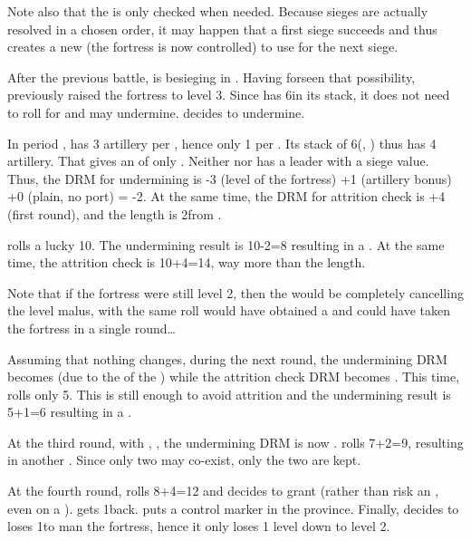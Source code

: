 Note also that the \SoS is only checked when needed. Because sieges are
actually resolved in a chosen order, it may happen that a first siege succeeds
and thus creates a new \SoS (the fortress is now controlled) to use for the
next siege.

\begin{exemple}[Undermining]
  After the previous battle, \FRA is besieging \villeArras in
  \provinceArtois. Having forseen that possibility, \HIS previously raised the
  fortress to level 3. Since \FRA has 6\LD in its stack, it does not need to
  roll for  and may undermine. \FRA decides to
  undermine.

  In period , \FRA has 3 artillery per \ARMY\faceplus, hence only
  1 per \ARMY\facemoins. Its stack of 6\LD (\ARMY\faceplus, \ARMY\facemoins)
  thus has 4 artillery. That gives an  of only
  . Neither \FRA nor \HIS has a leader with a siege value. Thus, the
  DRM for undermining is -3 (level of the fortress) +1 (artillery bonus) +0
  (plain, no port) = -2. At the same time, the DRM for attrition check is +4
  (first round), and the \LoS length is 2\MP from \villeParis.

  \FRA rolls a lucky 10. The undermining result is 10-2=8 resulting in a
  \USURE\faceplus. At the same time, the attrition check is 10+4=14, way more
  than the \LoS length.

  Note that if the fortress were still level 2, then the  would be  completely cancelling the level malus, with the
  same roll \FRA would have obtained a  and could have taken the
  fortress in a single round\ldots

  \smallskip

  Assuming that nothing changes, during the next round, the undermining DRM
  becomes  (due to the  of the \USURE\faceplus) while the
  attrition check DRM becomes . This time, \FRA rolls only 5. This is
  still enough to avoid attrition and the undermining result is 5+1=6
  resulting in a \USURE\facemoins.

  At the third round, with \USURE\faceplus, \USURE\facemoins, the undermining
  DRM is now . \FRA rolls 7+2=9, resulting in another
  \USURE\faceplus. Since only two \USURE may co-exist, only the two \Faceplus
  are kept.

  At the fourth round, \FRA rolls 8+4=12 and decides to grant \HIS {} (rather than risk an , even on a
  ). \HIS gets 1\LD back. \FRA puts a control marker in the
  province. Finally, \FRA decides to loses 1\LD to man the fortress, hence it
  only loses 1 level down to level 2.
\end{exemple}

